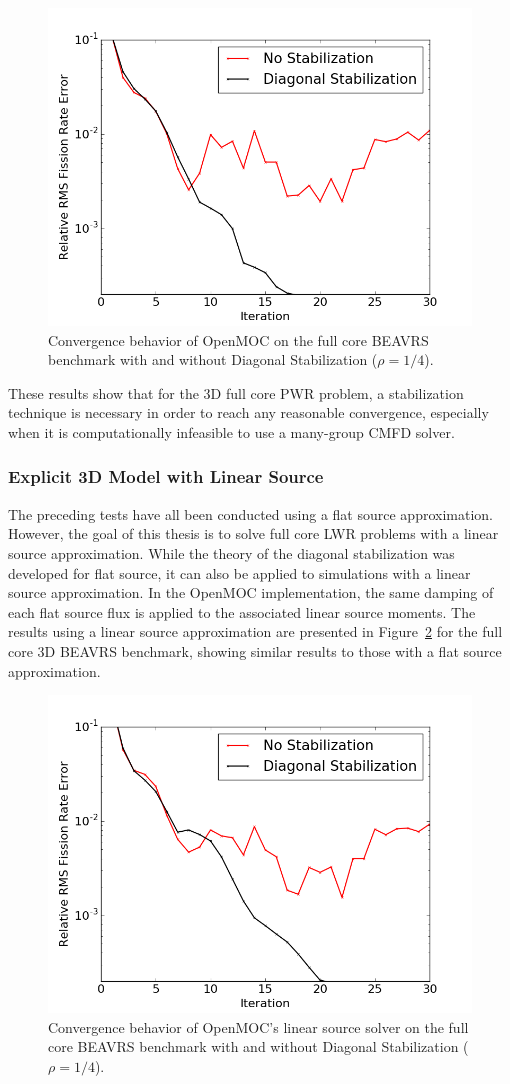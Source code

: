 \begin{figure}[ht!]
	\centering
	\includegraphics[width=0.65\linewidth]{figures/convergence/full-core-3D.png}
	\caption{Convergence behavior of OpenMOC on the full core \ac{BEAVRS} benchmark with and without Diagonal Stabilization ($\rho = 1/4$).}
	\label{fig:fc-3D}
\end{figure}

These results show that for the 3D full core \ac{PWR} problem, a stabilization technique is necessary in order to reach any reasonable convergence, especially when it is computationally infeasible to use a many-group \ac{CMFD} solver.

\subsubsection{Explicit 3D Model with Linear Source}

The preceding tests have all been conducted using a flat source approximation. However, the goal of this thesis is to solve full core \ac{LWR} problems with a linear source approximation. While the theory of the diagonal stabilization was developed for flat source, it can also be applied to simulations with a linear source approximation. In the OpenMOC implementation, the same damping of each flat source flux is applied to the associated linear source moments. The results using a linear source approximation are presented in Figure~\ref{fig:fc-3D-ls} for the full core 3D BEAVRS benchmark, showing similar results to those with a flat source approximation.

\begin{figure}[ht!]
	\centering
	\includegraphics[width=0.65\linewidth]{figures/convergence/full-core-3D-ls.png}
	\caption{Convergence behavior of OpenMOC's linear source solver on the full core \ac{BEAVRS} benchmark with and without Diagonal Stabilization ($\rho = 1/4$).}
	\label{fig:fc-3D-ls}
\end{figure}

